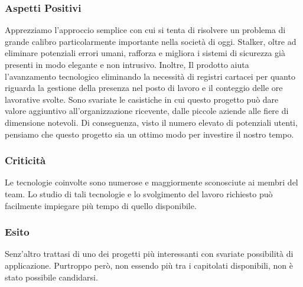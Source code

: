 	\subsubsection{Aspetti Positivi}
		Apprezziamo l'approccio semplice con cui si tenta di risolvere un problema di grande calibro particolarmente importante nella società di oggi. Stalker, oltre ad eliminare potenziali errori umani, rafforza e migliora i sistemi di sicurezza già presenti in modo elegante e non intrusivo.
		Inoltre, Il prodotto aiuta l'avanzamento tecnologico eliminando la necessità di registri cartacei per quanto riguarda la gestione della presenza nel posto di lavoro e il conteggio delle ore lavorative svolte.
		Sono svariate le casistiche in cui questo progetto può dare valore aggiuntivo all'organizzazione ricevente, dalle piccole aziende alle fiere di dimensione notevoli. Di conseguenza, visto il numero elevato di potenziali utenti, pensiamo che questo progetto sia un ottimo modo per investire il nostro tempo.
	
	\subsubsection{Criticità}
		Le tecnologie coinvolte sono numerose e maggiormente sconosciute ai membri del team. Lo studio di tali tecnologie e lo svolgimento del lavoro richiesto può facilmente impiegare più tempo di quello disponibile.
	
	\subsubsection{Esito}
		Senz'altro trattasi di uno dei progetti più interessanti con svariate possibilità di applicazione. Purtroppo però, non essendo più tra i capitolati disponibili, non è stato possibile candidarsi.